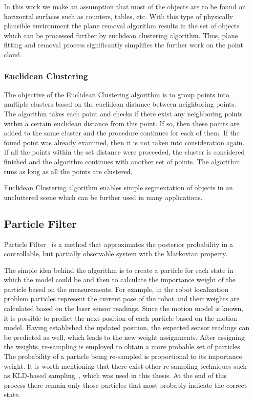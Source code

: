 In this work we make an assumption that most of the 
objects are to be found on horizontal surfaces such as counters, tables, etc. With this type of physically plausible environment the plane removal algorithm results in the set of objects which can be processed further by euclidean clustering algorithm. Thus, plane fitting and removal process significantly simplifies the further work on the point cloud.



\subsubsection{Euclidean Clustering}
The objective of the Euclidean Clustering algorithm is to group points into multiple clusters based on the euclidean distance between neighboring points. The algorithm takes each point and checks if there exist any neighboring points within a certain euclidean distance from this point. If so, then these points are added to the same cluster and the procedure continues for each of them. If the found point was already examined, then it is not taken into consideration again. If all the points within the set distance were proceeded, the cluster is considered finished and the algorithm continues with another set of points. The algorithm runs as long as all the points are clustered. 

Euclidean Clustering algorithm enables simple segmentation of objects in an uncluttered scene which can be further used in many applications.   

\subsection{Particle Filter}
Particle Filter~\cite{Thrun02d} is a method that approximates the posterior probability in a controllable, but partially observable system with the Markovian property. 

The simple idea behind the algorithm is to create a particle for each state in which the model could be and then to calculate the importance weight of the particle based on the measurements. For example, in the robot localization problem particles represent the current pose of the robot and their weights are calculated based on the laser sensor readings. Since the motion model is known, it is possible to predict the next position of each particle based on the motion model. Having established the updated position, the expected sensor readings can be predicted as well, which leads to the new weight assignments. After assigning the weights, re-sampling is employed to obtain a more probable set of particles. The probability of a particle being re-sampled is proportional to its importance weight. It is worth mentioning that there exist other re-sampling techniques such as KLD-based sampling~\cite{Fox01KLD}, which was used in this thesis.  At the end of this process there remain only those particles that most probably indicate the correct state.

